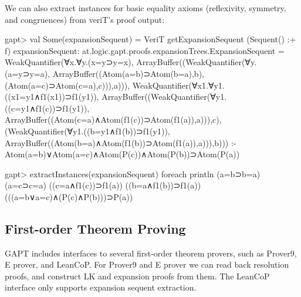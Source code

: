 \documentclass[a4paper,11pt]{article}
\begin{document}
We can also extract instances for basic equality axioms (reflexivity, symmetry,
and congruences) from veriT's proof output:
\begin{clilisting}
gapt> val Some(expansionSequent) = VeriT getExpansionSequent (Sequent() :+ f)
expansionSequent: at.logic.gapt.proofs.expansionTrees.ExpansionSequent = WeakQuantifier(∀x.∀y.(x=y⊃y=x), ArrayBuffer((WeakQuantifier(∀y.(a=y⊃y=a), ArrayBuffer((Atom(a=b)⊃Atom(b=a),b), (Atom(a=c)⊃Atom(c=a),c))),a))), WeakQuantifier(∀x1.∀y1.((x1=y1∧f1(x1))⊃f1(y1)), ArrayBuffer((WeakQuantifier(∀y1.((c=y1∧f1(c))⊃f1(y1)), ArrayBuffer((Atom(c=a)∧Atom(f1(c))⊃Atom(f1(a)),a))),c), (WeakQuantifier(∀y1.((b=y1∧f1(b))⊃f1(y1)), ArrayBuffer((Atom(b=a)∧Atom(f1(b))⊃Atom(f1(a)),a))),b))) :- Atom(a=b)∨Atom(a=c)∧Atom(P(c))∧Atom(P(b))⊃Atom(P(a))

gapt> extractInstances(expansionSequent) foreach println
(a=b⊃b=a)
(a=c⊃c=a)
((c=a∧f1(c))⊃f1(a))
((b=a∧f1(b))⊃f1(a))
(((a=b∨a=c)∧(P(c)∧P(b)))⊃P(a))

\end{clilisting}

\subsection{First-order Theorem Proving}

GAPT includes interfaces to several first-order theorem provers, such as
Prover9, E prover, and LeanCoP.  For Prover9 and E prover we can read back
resolution proofs, and construct LK and expansion proofs from them.  The
LeanCoP interface only supports expansion sequent extraction.
\end{document}
